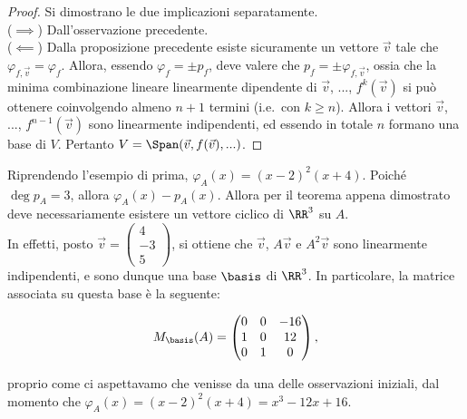 \documentclass[11pt]{article}
\begin{document}
\begin{proof} Si dimostrano le due implicazioni separatamente. \\

($\implies$) Dall'osservazione precedente. \\
($\impliedby$) Dalla proposizione precedente esiste sicuramente
un vettore $\Vec{v}$ tale che $\varphi_{f,\Vec{v}} = \varphi_f$. Allora, essendo $\varphi_f = \pm p_f$, deve valere
che $p_f = \pm \varphi_{f, \Vec{v}}$, ossia che la minima
combinazione lineare linearmente dipendente di $\Vec{v}$, ..., $f^k(\Vec{v})$ si può ottenere coinvolgendo almeno $n+1$
termini (i.e.~con $k\geq n$). Allora i vettori
$\Vec{v}$, ...,
$f^{n-1}(\Vec{v})$ sono linearmente indipendenti, ed essendo
in totale $n$ formano una base di $V$. Pertanto $V = \Span(\Vec{v}, f(\Vec{v}), ...)$.
\end{proof}

\begin{example}
    Riprendendo l'esempio di prima, $\varphi_A(x) = (x-2)^2(x+4)$. Poiché $\deg p_A = 3$, allora $\varphi_A(x) - p_A(x)$. Allora per il teorema appena dimostrato deve
    necessariamente esistere un vettore ciclico di $\RR^3$ su
    $A$. \\

    In effetti, posto $\Vec{v} = \begin{pmatrix}
        4 \\ -3 \\ 5
    \end{pmatrix}$, si ottiene che $\Vec{v}$, $A\Vec{v}$ e
    $A^2\Vec{v}$ sono linearmente indipendenti, e sono
    dunque una base $\basis$ di $\RR^3$. In particolare, la
    matrice associata su questa base è la seguente:

    \[ M_\basis(A) = \begin{pmatrix}
        0 & 0 & -16 \\
        1 & 0 & 12 \\
        0 & 1 & 0 \\
    \end{pmatrix}, \]

    \vskip 0.1in

    proprio come ci aspettavamo che venisse da una delle osservazioni
    iniziali, dal momento che $\varphi_A(x) = (x-2)^2(x+4) = x^3 - 12x + 16$.
\end{example}
\end{document}
